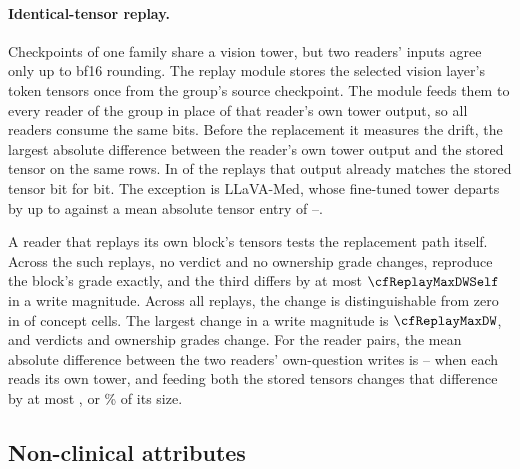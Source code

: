 \paragraph{Identical-tensor replay.} Checkpoints of one family share a vision tower, but two readers' inputs agree only up to bf16 rounding. The replay module stores the selected vision layer's token tensors once from the group's source checkpoint. The module feeds them to every reader of the group in place of that reader's own tower output, so all readers consume the same bits. Before the replacement it measures the drift, the largest absolute difference between the reader's own tower output and the stored tensor on the same rows. In \cfReplayDriftZero{} of the \cfReplayBlocks{} replays that output already matches the stored tensor bit for bit. The exception is LLaVA-Med, whose fine-tuned tower departs by up to \cfReplayDriftMax{} against a mean absolute tensor entry of \cfReplayTensorMin{}--\cfReplayTensorMax{}.

A reader that replays its own block's tensors tests the replacement path itself. Across the \cfReplaySelf{} such replays, no verdict and no ownership grade changes, \cfReplaySelfExact{} reproduce the block's grade exactly, and the third differs by at most $\cfReplayMaxDWSelf$ in a write magnitude. Across all \cfReplayBlocks{} replays, the change is distinguishable from zero in \cfReplayMoved{} of \cfReplayCells{} concept cells. The largest change in a write magnitude is $\cfReplayMaxDW$, and \cfReplayVerdictChanges{} verdicts and \cfReplayOwnedChanges{} ownership grades change. For the \cfReplayPairs{} reader pairs, the mean absolute difference between the two readers' own-question writes is \cfReplayPairOwnMin{}--\cfReplayPairOwnMax{} when each reads its own tower, and feeding both the stored tensors changes that difference by at most \cfReplayChangeMax{}, or \cfReplayRelMax\% of its size.

\subsection{Non-clinical attributes}
\label{app:cf-attributes}

